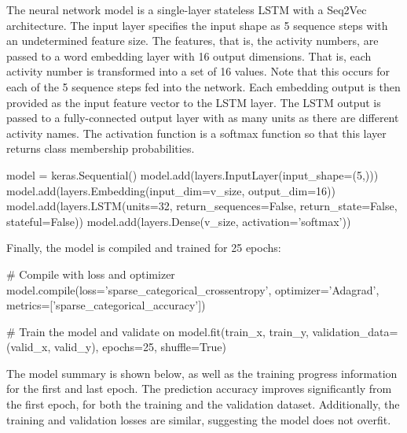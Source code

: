 The neural network model is a single-layer stateless LSTM with a Seq2Vec architecture. The input layer specifies the input shape as 5 sequence steps with an undetermined feature size. The features, that is, the activity numbers, are passed to a word embedding layer with 16 output dimensions. That is, each activity number is transformed into a set of 16 values. Note that this occurs for each of the 5 sequence steps fed into the network. Each embedding output is then provided as the input feature vector to the LSTM layer. The LSTM output is passed to a fully-connected output layer with as many units as there are different activity names. The activation function is a softmax function so that this layer returns class membership probabilities. 

\begin{samepage}
\begin{pythoncode}
model = keras.Sequential()
model.add(layers.InputLayer(input_shape=(5,)))
model.add(layers.Embedding(input_dim=v_size, output_dim=16))
model.add(layers.LSTM(units=32,
    return_sequences=False, return_state=False, stateful=False))
model.add(layers.Dense(v_size, activation='softmax'))
\end{pythoncode}
\end{samepage}

Finally, the model is compiled and trained for 25 epochs:

\begin{samepage}
\begin{pythoncode}
# Compile with loss and optimizer
model.compile(loss='sparse_categorical_crossentropy',
              optimizer='Adagrad',
              metrics=['sparse_categorical_accuracy'])

# Train the model and validate on
model.fit(train_x, train_y,
          validation_data=(valid_x, valid_y),
          epochs=25, shuffle=True)
\end{pythoncode}
\end{samepage}

The model summary is shown below, as well as the training progress information for the first and last epoch. The prediction accuracy improves significantly from the first epoch, for both the training and the validation dataset. Additionally, the training and validation losses are similar, suggesting the model does not overfit.

